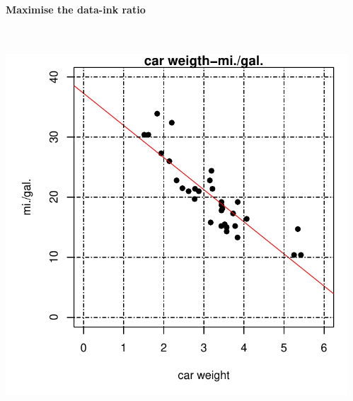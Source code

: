 \documentclass[8pt]{beamer}
\begin{document}
\begin{frame}
\frametitle{\insertsection}
\framesubtitle{Maximise the data-ink ratio}

\begin{columns}[t]
\\
\includegraphics[width=0.9\linewidth]{data_ink_l}

\\

\end{columns}
  
\end{frame}
\end{document}
